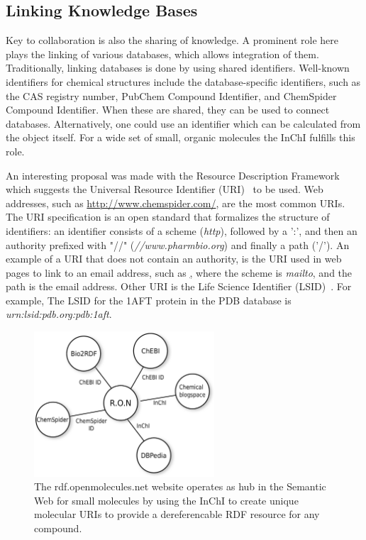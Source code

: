 \documentclass[11pt]{book}
\begin{document}
\subsection{Linking Knowledge Bases}

Key to collaboration is also the sharing of knowledge. A prominent role here
plays the linking of various databases, which allows integration of them.
Traditionally, linking databases is done by using shared identifiers.
Well-known identifiers for chemical structures include the
database-specific identifiers, such as the CAS registry number,
PubChem Compound Identifier, and ChemSpider Compound Identifier.
When these are shared, they can be used to connect databases.
Alternatively, one could use an identifier which can be calculated
from the object itself. For a wide set of small, organic molecules
the InChI fulfills this role.

An interesting proposal was made with the Resource Description
Framework~\cite{Carroll:04:RDF} which suggests the Universal
Resource Identifier (URI)~\cite{rfc3986} to be used.
Web addresses, such as \url{http://www.chemspider.com/}, are
the most common URIs. The URI specification is an open
standard that formalizes the structure of identifiers:
an identifier consists of a scheme (\textit{http}),
followed by a ':', and then an authority prefixed with
"//" (\textit{//www.pharmbio.org}) and
finally a path ('/'). An example of a URI that does not contain an authority,
is the URI used in web pages to link to an email address, such as
\href{mailto:bioclipse-devel@lists.sourceforge.net}, where the
scheme is \textit{mailto}, and the path is the email address.
Other URI is the Life Science Identifier (LSID)~\cite{Clark2004}.
For example, The LSID for the 1AFT protein in the
PDB database is \textit{urn:lsid:pdb.org:pdb:1aft}.

\begin{figure}[bt]
\begin{center}
\includegraphics[width=0.6\textwidth]{graphics/ons.pdf}
\end{center}
\caption{The rdf.openmolecules.net website operates as hub
in the Semantic Web for small molecules by using the InChI
to create unique molecular URIs to provide a dereferencable
RDF resource for any compound.}
\label{fig:ons}
\end{figure}
\end{document}
